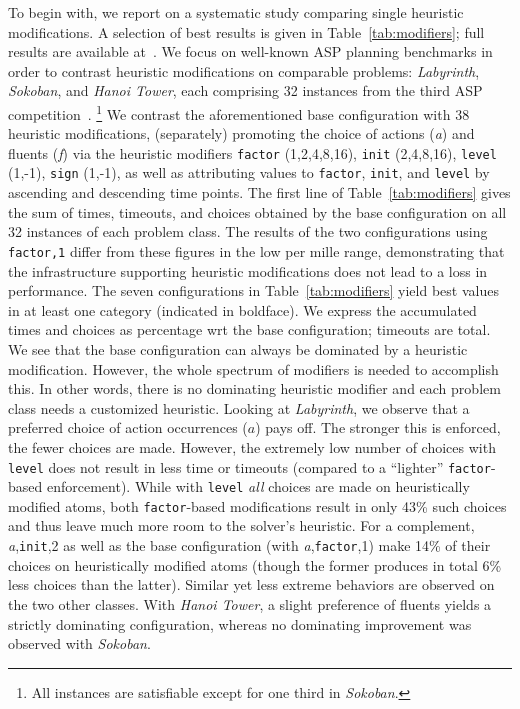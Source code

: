 \documentclass[letterpaper]{article}
\begin{document}
%
To begin with,
we report on a systematic study comparing single heuristic modifications.
A selection of best results is given in Table~\ref{tab:modifiers};
full results are available at~\cite{hclasp}.
We focus on well-known ASP planning benchmarks in order to contrast heuristic modifications on comparable problems:
\textit{Labyrinth}, \textit{Sokoban}, and \textit{Hanoi Tower}, each comprising 32 instances from the third ASP competition~\cite{contest11a}.%
\footnote{All instances are satisfiable except for one third in \textit{Sokoban}.}
We contrast the aforementioned base configuration with 38 heuristic modifications,
(separately) promoting the choice of actions (\emph{a}) and fluents (\emph{f}) via the heuristic modifiers
\texttt{factor} (1,2,4,8,16),
\texttt{init} (2,4,8,16),
\texttt{level} (1,-1),
\texttt{sign} (1,-1),
as well as attributing values to \texttt{factor}, \texttt{init}, and \texttt{level} by ascending and descending time points.
%
The first line of Table~\ref{tab:modifiers} gives the sum of times, timeouts, and choices obtained by the base configuration on all 32 instances of each problem class.
The results of the two configurations using \texttt{factor,1} differ from these figures in the low per mille range, demonstrating that the infrastructure supporting heuristic
modifications does not lead to a loss in performance.
The seven configurations in Table~\ref{tab:modifiers} yield best values in at least one category (indicated in boldface).
We express the accumulated times and choices as percentage wrt the base configuration; timeouts are total.
We see that the base configuration can always be dominated by a heuristic modification.
However, the whole spectrum of modifiers is needed to accomplish this.
In other words, there is no dominating heuristic modifier and each problem class needs a customized heuristic.
Looking at \textit{Labyrinth}, we observe that a preferred choice of action occurrences ($a$) pays off.
The stronger this is enforced, the fewer choices are made.
However, the extremely low number of choices with \texttt{level} does not result in less time or timeouts
(compared to a ``lighter'' \texttt{factor}-based enforcement).
While with \texttt{level} \emph{all} choices are made on heuristically modified atoms,
both \texttt{factor}-based modifications result in only 43\% such choices and thus leave much more room to the solver's heuristic.
For a complement, \textit{a},\texttt{init},2 as well as the base configuration (with \textit{a},\texttt{factor},1) 
make 14\% of their choices on heuristically modified atoms
(though the former produces in total 6\% less choices than the latter).
Similar yet less extreme behaviors are observed on the two other classes.
With \textit{Hanoi Tower}, a slight preference of fluents yields a strictly dominating configuration,
whereas no dominating improvement was observed with \textit{Sokoban}.
\end{document}
